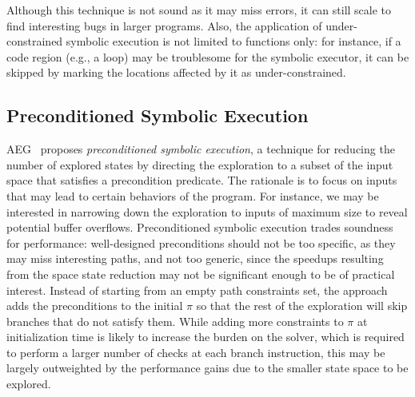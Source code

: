 Although this technique is not sound as it may miss errors, it can still scale to find interesting bugs in larger programs. Also, the application of under-constrained symbolic execution is not limited to functions only: for instance, if a code region (e.g., a loop) may be troublesome for the symbolic executor, it can be skipped by marking the locations affected by it as under-constrained. 

\subsection{Preconditioned Symbolic Execution}%
\label{precontioned-symbolic-execution}

{\sc AEG}~\cite{AEG-NDSS11} proposes {\em preconditioned symbolic execution}, a technique for reducing the number of explored states by directing the exploration to a subset of the input space that satisfies a precondition predicate. The rationale is to focus on inputs that may lead to certain behaviors of the program.
For instance, we may be interested in narrowing down the exploration to inputs of maximum size to reveal potential buffer overflows. Preconditioned symbolic execution trades soundness for performance: well-designed preconditions should not be too specific, as they may miss interesting paths, and not too generic, since the speedups resulting from the space state reduction may not be significant enough to be of practical interest. Instead of starting from an empty path constraints set, the approach adds the preconditions to the initial $\pi$ so that the rest of the exploration will skip branches that do not satisfy them. While adding more constraints to $\pi$ at initialization time is likely to increase the burden on the solver, which is required to perform a larger number of checks at each branch instruction, this may be largely outweighted by the performance gains due to the smaller state space to be explored.

